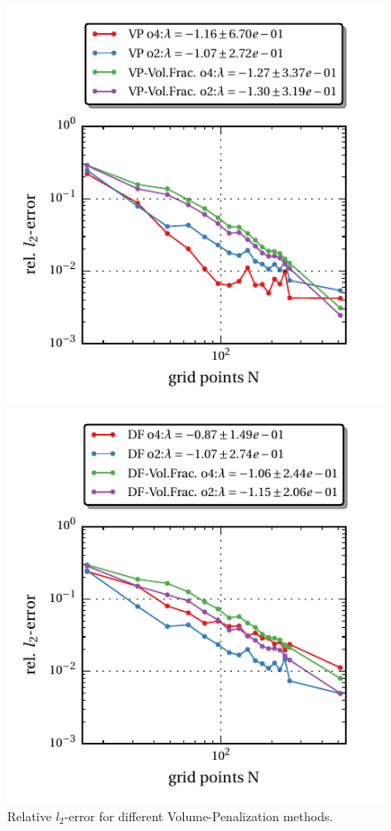 \clearpage
\begin{figure}[!bp]
  \begin{minipage}[c]{0.5\textwidth}
      \includegraphics{gfx/immersed_boundary/tcflow/theo/vp.pdf}
      \caption{Relative $l_2$-error for different Volume-Penalization methods.}
  \end{minipage}
  \begin{minipage}[c]{0.5\textwidth}
      \includegraphics{gfx/immersed_boundary/tcflow/theo/df.pdf}

\end{minipage}
\end{figure}
